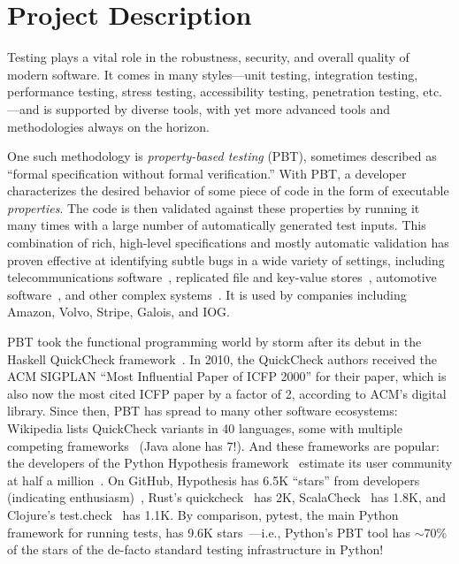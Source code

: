 \section*{Project Description}

Testing plays a vital role in the robustness, security, and overall
quality of modern software. It comes in many styles---unit testing,
integration testing, performance testing, stress testing,
accessibility testing, penetration testing, etc.---and is supported by
diverse tools, with yet more advanced tools and methodologies always on
the horizon.

One such methodology is {\em property-based testing} (PBT),
sometimes described as ``formal specification without formal
verification.''  With PBT, a developer characterizes the desired
behavior of
some piece of code in the form of executable {\em
  properties}. The code is
then validated against these properties by running it many times
with a large number of automatically generated test
inputs.
%
This combination of rich, high-level specifications and mostly
automatic validation has proven effective at identifying
subtle bugs in a wide variety of settings, including
telecommunications software~\cite{arts2006testing}, replicated
file and key-value
stores~\cite{MysteriesOfDropbox2016,Bornholt2021}, automotive
software~\cite{arts2015testing}, and other complex
systems~\cite{hughes_experiences_2016}.
It is used by companies including Amazon, Volvo, Stripe, Galois,
and IOG.

PBT took the functional programming world by storm after its
debut in the Haskell QuickCheck framework~\cite{ClaessenHughes00}.  In
2010, the
QuickCheck authors received the ACM SIGPLAN ``Most Influential Paper of ICFP
2000'' for their paper, which is also now the most cited
ICFP paper by
a factor of 2, according to ACM's digital library.  Since then,
PBT has spread to many other software ecosystems:
%
Wikipedia lists QuickCheck variants in 40 languages, some
with multiple competing frameworks~\cite{QuickCheckWikipedia} (Java alone has
7!).
%
And these frameworks are popular:
the developers of the Python Hypothesis framework~\cite{maciver2019hypothesis,HypothesisGithub} estimate its user community
at half a million~\cite{ZacPersonalCommunication,noauthor_python_nodate}.  On GitHub,
Hypothesis has 6.5K ``stars'' from developers (indicating enthusiasm)~\cite{borges_whats_2018}, Rust's
quickcheck~\cite{RustQuickcheckGithub} has 2K,
ScalaCheck~\cite{ScalaCheckGithub} has 1.8K, and Clojure's
test.check~\cite{ClojureTest.checkGithub} has 1.1K.
By comparison, pytest, the main Python framework for running
tests, has 9.6K stars~\cite{PytestGitHub}---i.e., Python's PBT tool has
$\sim$70\% of the stars of the de-facto standard testing infrastructure in
Python!

